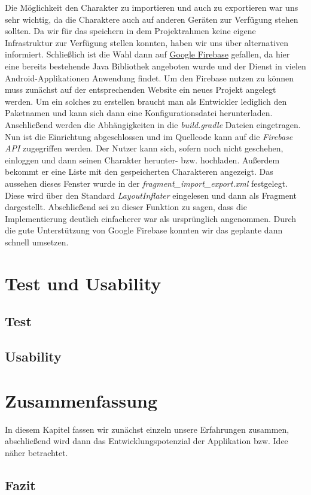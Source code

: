 Die Möglichkeit den Charakter zu importieren und auch zu exportieren war uns sehr wichtig, da die Charaktere auch auf anderen Geräten zur Verfügung stehen sollten. Da wir für das speichern in dem Projektrahmen keine eigene Infrastruktur zur Verfügung stellen konnten, haben wir uns über alternativen informiert. Schließlich ist die Wahl dann auf \hyperref[sdt:firebase]{Google Firebase} gefallen, da hier eine bereits bestehende Java Bibliothek angeboten wurde und der Dienst in vielen Android-Applikationen Anwendung findet. Um den Firebase nutzen zu können muss zunächst auf der entsprechenden Website ein neues Projekt angelegt werden. Um ein solches zu erstellen braucht man als Entwickler lediglich den Paketnamen und kann sich dann eine Konfigurationsdatei herunterladen. Anschließend werden die Abhängigkeiten in die \textit{build.gradle} Dateien eingetragen. Nun ist die Einrichtung abgeschlossen und im Quellcode kann auf die \textit{Firebase API} zugegriffen werden. Der Nutzer kann sich, sofern noch nicht geschehen, einloggen und dann seinen Charakter herunter- bzw. hochladen. Außerdem bekommt er eine Liste mit den gespeicherten Charakteren angezeigt. Das aussehen dieses Fenster wurde in der \textit{fragment\_import\_export.xml} festgelegt. Diese wird über den Standard \textit{LayoutInflater} eingelesen und dann als Fragment dargestellt. Abschließend sei zu dieser Funktion zu sagen, dass die Implementierung deutlich einfacherer war als ursprünglich angenommen. Durch die gute Unterstützung von \grqq Google Firebase\grqq{} konnten wir das geplante dann schnell umsetzen.

\section{Test und Usability}
\subsection{Test}
\subsection{Usability}

\section{Zusammenfassung}
In diesem Kapitel fassen wir zunächst einzeln unsere Erfahrungen zusammen, abschließend wird dann das Entwicklungspotenzial der Applikation bzw. Idee näher betrachtet.
\subsection{Fazit}
